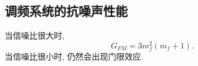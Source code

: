 \subsection{调频系统的抗噪声性能}
当信噪比很大时,
\begin{equation}
    G_{FM}=3m_f^2(m_f+1).
\end{equation}
当信噪比很小时, 仍然会出现门限效应.


